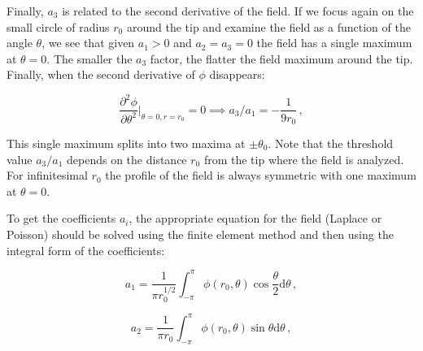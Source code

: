 \documentclass[]{pracamgr}
\begin{document}
    Finally, $a_3$ is related to the second derivative of the field. If we focus again on the small circle of radius $r_0$ around the tip and examine the field as a function of the angle $\theta$, we see that given $a_1>0$ and $a_2=a_3=0$ the field has a single maximum at $\theta = $0. The smaller the $a_3$ factor, the flatter the field maximum around the tip. Finally, when the second derivative of $\phi$ disappears:
    
    \begin{equation}\label{a3a1}
      \frac{\partial^2 \phi}{\partial \theta^2}\big|_{\theta=0, r=r_0} = 0 \implies a_3/a_1 = -\frac{1}{9 r_0} \,, 
    \end{equation}
    
    This single maximum splits into two maxima at $\pm \theta_0$. Note that the threshold value $a_3/a_1$ depends on the distance $r_0$ from the tip where the field is analyzed. For infinitesimal $r_0$ the profile of the field is always symmetric with one maximum at $\theta=0$.

    To get the coefficients $a_i$, the appropriate equation for the field (Laplace or Poisson) should be solved using the finite element method and then using the integral form of the coefficients:
    
    \begin{equation}
      \label{a1}
      a_1 = \frac{1}{\pi r_0^{1/2}}\int^{\pi}_{-\pi} \phi(r_0,\theta)\cos\frac{\theta}{2}\textrm{d}\theta \,,
    \end{equation} 
    
    \begin{equation}
      \label{a2}
      a_2 = \frac{1}{\pi r_0}\int^{\pi}_{-\pi} \phi(r_0,\theta)\sin\theta \textrm{d}\theta \,,
    \end{equation}
    
\end{document}
